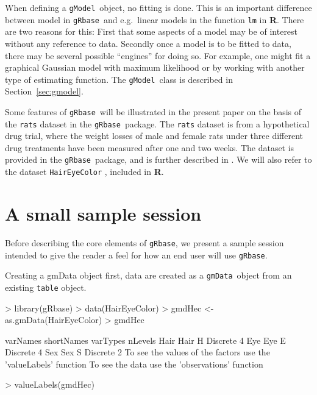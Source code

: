 \documentclass{article}
\def\pkg#1{\texttt{#1}}
\def\code#1{\texttt{#1}}
\def\gRbase                 {\pkg{gRbase}}
\def\gmData            {\code{gmData}}
\def\gmData             {\code{gmData}}
\def\gModel             {\code{gModel}} %
\def\R                  {\textsf{\bf R}}
\begin{document}
When defining a \gModel\ object, no fitting is done. This is an
important difference between model in \gRbase\ and e.g.\ linear models
in the function \verb|lm| in \R. There are two reasons for this: First
that some aspects of a model may be of interest without any reference
to data. Secondly once a model is to be fitted to data, there may be
several possible ``engines'' for doing so. For example, one might fit
a graphical Gaussian model with maximum likelihood or by working with
another type of estimating function.
The \gModel\ class is described in Section~\ref{sec:gmodel}.


Some features of \gRbase\ will be illustrated in the present paper on
the basis of the \verb+rats+ dataset in the \gRbase\ package.  The
\verb+rats+ dataset is from a hypothetical drug trial, where the
weight losses of male and female rats under three different drug
treatments have been measured after one and two weeks. The dataset is
provided in the \gRbase\ package, and is further described in
\cite{edwards:00}. We will also refer to the dataset
\verb|HairEyeColor| \citep{haireyecolor}, included in \R. 



\section{A small sample session}
\label{sec:samplesession}
Before describing the core elements of \gRbase, we present a sample
session intended to give the reader a feel for how an end user will use
\gRbase.

Creating a gmData object first, data are created as a \gmData\
object from an existing \code{table} object.  

\footnotesize
\begin{Schunk}
\begin{Sinput}
> library(gRbase)
> data(HairEyeColor)
> gmdHec <- as.gmData(HairEyeColor)
> gmdHec
\end{Sinput}
\begin{Soutput}
     varNames shortNames varTypes nLevels
Hair     Hair          H Discrete       4
Eye       Eye          E Discrete       4
Sex       Sex          S Discrete       2
To see the values of the factors use the 'valueLabels' function
To see the data use the 'observations' function
\end{Soutput}
\begin{Sinput}
> valueLabels(gmdHec)
\end{Sinput}
\end{Schunk}
\normalsize
\end{document}
